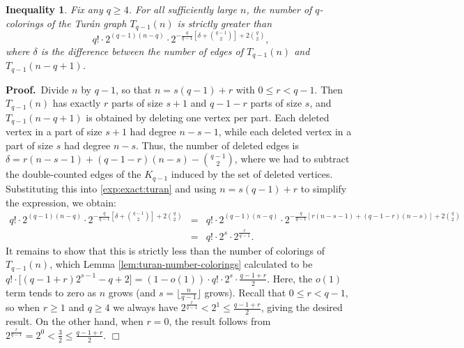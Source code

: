 \documentclass[11pt]{article}
\newtheorem{inequality}[theorem]{Inequality}
\begin{document}
\vspace{3mm}



\begin{inequality}
  \label{ineq:exact:turan:routine}
  Fix any $q \geq 4$.  For all sufficiently large $n$, the number of
  $q$-colorings of the Tur\'an graph $T_{q-1}(n)$ is strictly greater
  than
  \begin{equation}
    \label{exp:exact:turan}
    q! \cdot 2^{(q-1)(n-q)} \cdot 2^{
    -\frac{q}{q-1}  \left[ \delta + {q-1 \choose 2} \right] 
    + 2 {q \choose 2}},
  \end{equation}
  where $\delta$ is the difference between the number of edges of
  $T_{q-1}(n)$ and $T_{q-1}(n-q+1)$.
\end{inequality}

\noindent \textbf{Proof.}\, Divide $n$ by $q-1$, so that $n = s(q-1) +
r$ with $0 \leq r < q-1$.  Then $T_{q-1}(n)$ has exactly $r$ parts of
size $s+1$ and $q-1-r$ parts of size $s$, and $T_{q-1}(n-q+1)$ is
obtained by deleting one vertex per part.  Each deleted vertex in a
part of size $s+1$ had degree $n-s-1$, while each deleted vertex in a
part of size $s$ had degree $n-s$.  Thus, the number of deleted edges
is $\delta = r(n-s-1) + (q-1-r)(n-s) - {q-1 \choose 2}$, where we had
to subtract the double-counted edges of the $K_{q-1}$ induced by the
set of deleted vertices.  Substituting this into
\eqref{exp:exact:turan} and using $n = s(q-1)+r$ to simplify the
expression, we obtain:
\begin{eqnarray*}
  q! \cdot 2^{(q-1)(n-q)} \cdot 2^{
    -\frac{q}{q-1} \left[ \delta + {q-1 \choose 2} \right] 
    + 2 {q \choose 2}}
  &=& q! \cdot 2^{(q-1)(n-q)} \cdot 2^{
    -\frac{q}{q-1} \left[ r(n-s-1) + (q-1-r)(n-s) \right] 
    + 2 {q \choose 2}} \\
  &=& %
  q! \cdot 2^s \cdot 2^{\frac{r}{q-1}}.
\end{eqnarray*}
It remains to show that this is strictly less than the number of
colorings of $T_{q-1}(n)$, which Lemma
\ref{lem:turan-number-colorings} calculated to be $q! \cdot \big[
(q-1+r)2^{s-1} - q + 2 \big] = (1-o(1)) \cdot q! \cdot 2^s \cdot
\frac{q-1+r}{2}$.  Here, the $o(1)$ term tends to zero as $n$ grows
(and $s = \big\lfloor \frac{n}{q-1} \big\rfloor$ grows).  Recall that
$0 \leq r < q-1$, so when $r \geq 1$ and $q \geq 4$ we always have
$2^{\frac{r}{q-1}} < 2^1 \leq \frac{q-1+r}{2}$, giving the desired
result.  On the other hand, when $r = 0$, the result follows from
$2^{\frac{r}{q-1}} = 2^0 < \frac{3}{2} \leq \frac{q-1+r}{2}$.  \hfill
$\Box$
\end{document}
